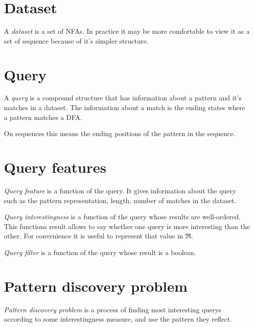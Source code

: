 \section{Dataset}

A \emph{dataset} is a set of NFAs. In practice it may be more comfortable
to view it as a set of sequence because of it's simpler structure.


\section{Query}

A \emph{query} is a compound structure that has information about a
pattern and it's matches in a dataset. The information about a
match is the ending states where a pattern matches a DFA.

On sequences this means the ending positions of the pattern 
in the sequence.


\section{Query features}

\emph{Query feature} is a function of the query. It gives 
information about the query such as the pattern representation, 
length, number of matches in the dataset.


\emph{Query interestingness} is a function of the query whose
results are well-ordered. This functions result allows to
say whether one query is more interesting than the other.
For convenience it is useful to represent that value in
$\Re$.


\emph{Query filter} is a function of the query whose result
is a boolean.


\section{Pattern discovery problem}

\emph{Pattern discovery problem} is a process of finding
most interesting querys according to some 
interestingness measure, and use the pattern they reflect.